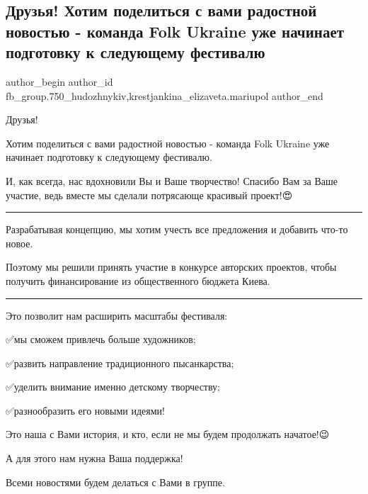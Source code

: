  
 
 
 
 

\subsection{Друзья! Хотим поделиться с вами радостной новостью - команда Folk Ukraine уже начинает подготовку к следующему фестивалю}
\label{sec:27_04_2018.fb.fb_group.750_hudozhnykiv.1.folk_ua_uzhe_nachinajet_podgotovku_k_sledujuschemu_festivalju}
 
\ifcmt
 author_begin
   author_id fb_group.750_hudozhnykiv,krestjankina_elizaveta.mariupol
 author_end
\fi

Друзья!

Хотим поделиться с вами радостной новостью - команда Folk Ukraine уже начинает
подготовку к следующему фестивалю. 🎉🎉🎉

И, как всегда, нас вдохновили Вы и Ваше творчество! Спасибо Вам за Ваше
участие, ведь вместе мы сделали потрясающе красивый проект!😍

\par\noindent\rule{\textwidth}{0.4pt}

Разрабатывая концепцию, мы хотим учесть все предложения и добавить что-то новое. 

Поэтому мы решили принять участие в конкурсе авторских проектов, чтобы получить
финансирование из общественного бюджета Киева. 

\par\noindent\rule{\textwidth}{0.4pt}

Это позволит нам расширить масштабы фестиваля:

✅мы сможем привлечь больше художников;\par
✅развить направление традиционного пысанкарства;\par
✅уделить внимание именно детскому творчеству;\par
✅разнообразить его новыми идеями!\par

Это наша с Вами история, и кто, если не мы будем продолжать начатое!😉

А для этого нам нужна Ваша поддержка! 🙏🙏🙏

Всеми новостями будем делаться с Вами в группе.🤳


